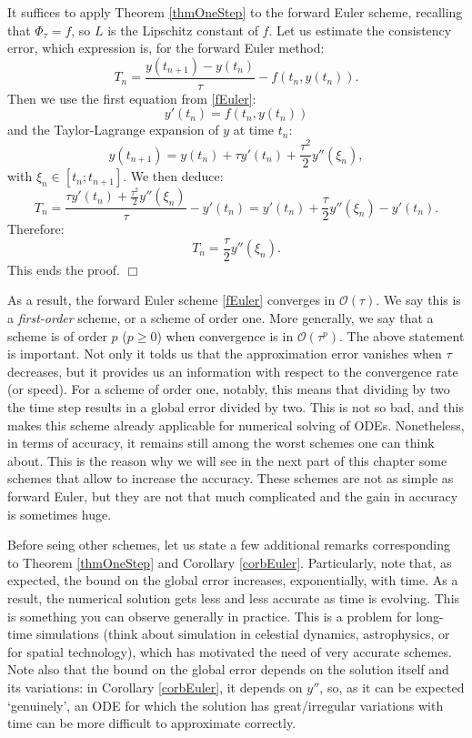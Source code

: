 \documentclass{article}
\begin{document}
 It suffices to apply Theorem \ref{thmOneStep} to the forward Euler scheme, recalling that $\Phi_\tau = f$, so $L$ is the Lipschitz constant of $f$. Let us estimate the consistency error, which expression is, for the forward Euler method:
\[
T_n = \frac{y(t_{n+1})-y(t_n)}{\tau} - f ( t_n, y (t_n ) ).
\]
Then we use the first equation from \eqref{fEuler}:
\[
y'(t_n) = f ( t_n , y(t_n) )
\]
and the Taylor-Lagrange expansion of $y$ at time $t_n$:
\[
y(t_{n+1}) = y(t_n) + \tau y'(t_n) + \frac{\tau^2}{2} y''(\xi_n),
\]
with $\xi_n \in [t_n;t_{n+1}]$.
We then deduce:
\[
T_n = \frac{\tau y'(t_n) + \frac{\tau^2}{2} y''(\xi_n)}{\tau} - y'(t_n)
= y'(t_n) + \frac{\tau}{2} y''(\xi_n) - y'(t_n).
\]
Therefore:
\[
T_n = \frac{\tau}{2} y''(\xi_n).
\]
This ends the proof.
$\Box$

\medskip

\noindent %
As a result, the forward Euler scheme \eqref{fEuler} converges in $\mathcal{O}(\tau)$. We say this is a \emph{first-order} scheme, or a scheme of order one. More generally, we say that a scheme is of order $p$ ($p\geq0$) when convergence is in $\mathcal{O}(\tau^p)$. The above statement is important. Not only it tolds us that the approximation error vanishes when $\tau$ decreases, but it provides us an information with respect to the convergence rate (or speed). For a scheme of order one, notably, this means that dividing by two the time step results in a global error divided by two. This is not so bad, and this makes this scheme already applicable for numerical solving of ODEs. Nonetheless, in terms of accuracy, it remains still among the worst schemes one can think about. This is the reason why we will see in the next part of this chapter some schemes that allow to increase the accuracy. These schemes are not as simple as forward Euler, but they are not that much complicated and the gain in accuracy is sometimes huge.

\medskip

Before seing other schemes, let us state a few additional remarks corresponding to Theorem \ref{thmOneStep} and Corollary \ref{corbEuler}. Particularly, note that, as expected, the bound on the global error increases, exponentially, with time. As a result, the numerical solution gets less and less accurate as time is evolving. This is something you can observe generally in practice. This is a problem for long-time simulations (think about simulation in celestial dynamics, astrophysics, or for spatial technology), which has motivated the need of very accurate schemes. Note also that the bound on the global error depends on the solution itself and its variations: in Corollary \ref{corbEuler}, it depends on $y''$, so, as it can be expected `genuinely', an ODE for which the solution has great/irregular variations with time can be more difficult to approximate correctly.
\end{document}
